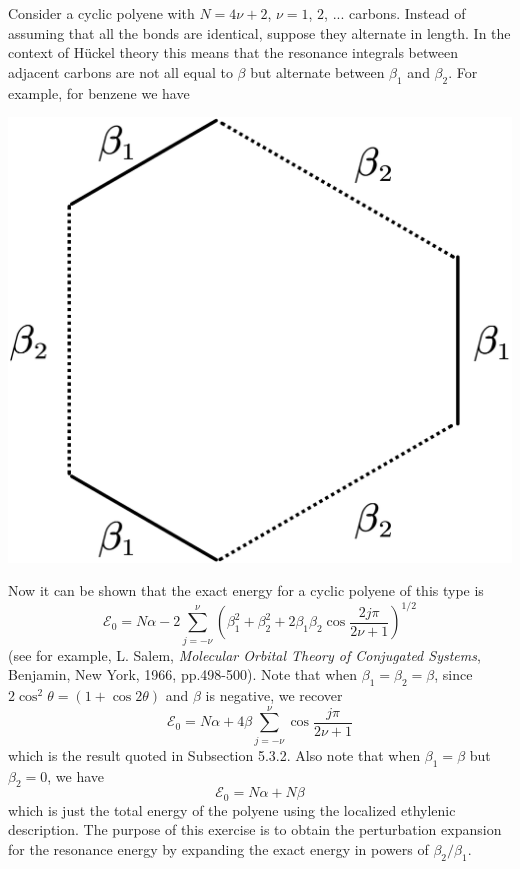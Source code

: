 \documentclass[a4paper]{book}
\newcounter{exercise}[chapter]
\begin{document}
	\begin{exercise}
	Consider a cyclic polyene with $N = 4\nu+2$, $\nu=1$, $2$, ... carbons. Instead of assuming that all the bonds are identical, suppose they alternate in length. In the context of H{\"u}ckel theory this means that the resonance integrals between adjacent carbons are not all equal to $\beta$ but alternate between $\beta_1$ and $\beta_2$. For example, for benzene we have
	
	\begin{center}
	\includegraphics[scale=1.2]{./pictures/6.06/exercise_1.png}
	\end{center}
	
	Now it can be shown that the exact energy for a cyclic polyene of this type is
	\[
		\mathscr{E}_0 = N \alpha - 2 \sum_{j=-\nu}^\nu \left( \beta^2_1 + \beta^2_2 + 2 \beta_1 \beta_2 \cos{\frac{2j\pi}{2\nu+1}} \right)^{1/2}
	\]
	(see for example, L. Salem, {\it Molecular Orbital Theory of Conjugated Systems}, Benjamin, New York, 1966, pp.498-500). Note that when $\beta_1 = \beta_2 = \beta$, since $2\cos^2\theta=(1+\cos2\theta)$ and $\beta$ is negative, we recover
	\[
		\mathscr{E}_0 = N \alpha + 4 \beta \sum_{j=-\nu}^\nu \cos{\frac{j\pi}{2\nu+1}}
	\]
	which is the result quoted in Subsection 5.3.2. Also note that when $\beta_1=\beta$ but $\beta_2=0$, we have
	\[
		\mathscr{E}_0 = N \alpha + N \beta
	\]
	which is just the total energy of the polyene using the localized ethylenic description. The purpose of this exercise is to obtain the perturbation expansion for the resonance energy by expanding the exact energy in powers of $\beta_2/\beta_1$.
	\begin{enumerate}
	

\end{enumerate}
\end{exercise}
\end{document}
